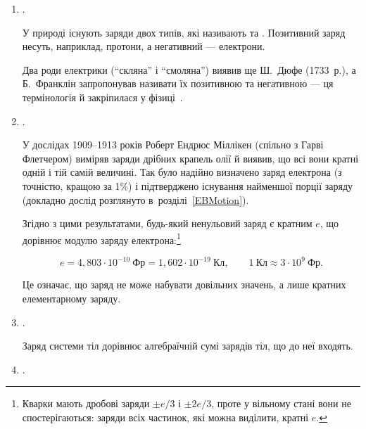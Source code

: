 \begin{enumerate}
	\item {}.

	      У природі існують заряди двох типів, які називають  та
	      . Позитивний заряд несуть, наприклад, протони, а
	      негативний --- електрони.

	      \begin{Historical}
		      Два роди електрики (\enquote{скляна} і \enquote{смоляна}) виявив ще Ш.~Дюфе
		      (1733~р.), а Б.~Франклін запропонував називати їх позитивною та негативною
		      --- ця термінологія й закріпилася у фізиці~\cite{Heilbron1979}.
	      \end{Historical}

	\item {}.

	      У дослідах 1909--1913 років Роберт Ендрюс Міллікен (спільно з Гарві Флетчером)
	      виміряв заряди дрібних крапель олії й виявив, що всі вони кратні одній і тій самій
	      величині. Так було надійно визначено заряд електрона (з точністю, кращою
	      за 1\%) і підтверджено існування найменшої порції заряду~\cite{Millikan1913} (докладно дослід розглянуто
	      в~розділі~\ref{EBMotion}).

	      Згідно з цими результатами, будь-який ненульовий заряд є кратним
	       $e$, що дорівнює модулю заряду електрона:\footnote{Кварки
	      мають дробові заряди $\pm e/3$ і $\pm 2e/3$, проте у вільному стані вони не
	      спостерігаються: заряди всіх частинок, які можна виділити, кратні $e$.}

	      \begin{equation*} e = 4{,}803 \cdot 10^{-10}\ \text{Фр} = 1{,}602 \cdot 10^{-19}\ \text{Кл}, \qquad 1~\text{Кл} \approx 3 \cdot 10^{9}~\text{Фр}. \end{equation*}

	      Це означає, що заряд не може набувати довільних значень, а лише кратних
	      елементарному заряду.

	\item {}.

	      Заряд системи тіл дорівнює алгебраїчній сумі зарядів тіл, що до неї входять.

	\item {}.


\end{enumerate}
